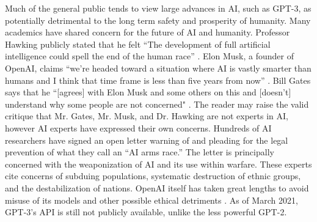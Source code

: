 \documentclass[12pt]{article}
\begin{document}
Much of the general public tends to view large advances in AI, such as GPT-3,
as potentially detrimental to the long term safety and prosperity of humanity.
Many academics have shared concern for the future of AI and humanity. Professor
Hawking publicly stated that he felt ``The development of full artificial
intelligence could spell the end of the human race'' \cite{jones14}. Elon Musk,
a founder of OpenAI, claims ``we're headed toward a situation where AI is
vastly smarter than humans and I think that time frame is less than five years
from now'' \cite{cuthbertson20}. Bill Gates says that he ``[agrees] with Elon
Musk and some others on this and [doesn't] understand why some people are not
concerned" \cite{rawlinson15}. The reader may raise the valid critique that Mr.
Gates, Mr. Musk, and Dr. Hawking are not experts in AI, however AI experts
have expressed their own concerns. Hundreds of AI researchers have signed an
open letter warning of and pleading for the legal prevention of what they call
an ``AI arms race.'' The letter is principally concerned with the weaponization of
AI and its use within warfare. These experts cite concerns of subduing
populations, systematic destruction of ethnic groups, and the destabilization
of nations.  OpenAI itself has taken great lengths to avoid misuse of its
models and other possible ethical detriments \cite{solaiman}. As of March 2021,
GPT-3's API is still not publicly available, unlike the less powerful GPT-2.
\end{document}
